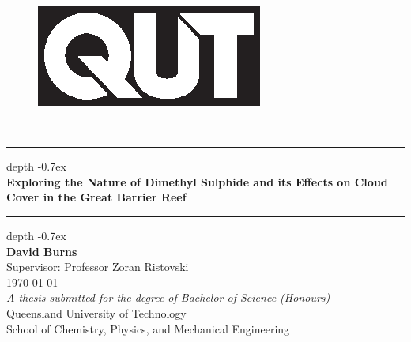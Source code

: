 
\begin{titlepage}
	\begin{center}
		\begin{figure}[h]
	 	    \centering
	 	    \includegraphics[scale=1.5]{Fig/QUT_Square_Black.eps}
	 	\end{figure}
	 	~\\
		\leavevmode\leaders\hrule height 0.7ex depth -0.7ex\hfill\kern0pt\\
		\LARGE
		\textbf{Exploring the Nature of Dimethyl Sulphide and its Effects on Cloud Cover in the Great Barrier Reef} \\
		\leavevmode\leaders\hrule height 0.7ex depth -0.7ex\hfill\kern0pt\\
		\vfill
		\textbf{David Burns}\\
		Supervisor: Professor Zoran Ristovski\\
		\vfill
		\printdayoff
		\today
		\\
		\vfill
		\large
		\textit{A thesis submitted for the degree of Bachelor of Science (Honours)}\\
		Queensland University of Technology\\
		School of Chemistry, Physics, and Mechanical Engineering

	\end{center}
\end{titlepage}